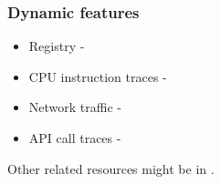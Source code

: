 \subsubsection{Dynamic features}
\begin{itemize}
  \item Registry - \cite{Ghiasi2015}
  \item CPU instruction traces - \cite{Carlin2017}
  \item Network traffic - \cite{Boukhtouta2015}
  \item API call traces -  \cite{Galal2015}
\end{itemize}

Other related resources might be in \cite{Singh2020, Sethi2019, Abdessadki2019, Gibert2020}.










